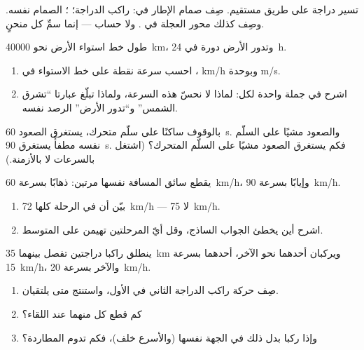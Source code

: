\begin{exercise}[$\star\star$]\label{exo:g10:relative-motion:9}
تسير دراجة على طريق مستقيم. صِف 
صمام الإطار في:  راكب الدراجة؛ ؛ 
الصمام نفسه. وصِف كذلك  محور العجلة في
. ولا حساب --- إنما سمِّ كل منحنٍ.
\end{exercise}

\begin{exercise}[$\star\star$]\label{exo:g10:relative-motion:10}
طول خط استواء الأرض نحو \qty{40000}{km}، وتدور الأرض
دورة في \qty{24}{h}.
\begin{enumerate}
  \item احسب سرعة نقطة على خط الاستواء في ،  \unit{km/h} وبوحدة \unit{m/s}.
  \item اشرح في جملة واحدة لكل: لماذا لا نحسّ هذه السرعة،
        ولماذا تبلّغ عبارتا ``تشرق الشمس'' و``تدور الأرض'' الرصد
        نفسه.
\end{enumerate}
\end{exercise}

\begin{exercise}[$\star\star$]\label{exo:g10:relative-motion:11}
بالوقوف ساكنًا على سلّم متحرك، يستغرق الصعود \qty{60}{s}.
والصعود مشيًا على السلّم نفسه مطفأً يستغرق \qty{90}{s}. فكم
يستغرق الصعود مشيًا على السلّم المتحرك؟ (اشتغل بالسرعات لا
بالأزمنة.)
\end{exercise}

\begin{exercise}[$\star\star\star$]\label{exo:g10:relative-motion:12}
يقطع سائق المسافة نفسها مرتين: ذهابًا بسرعة \qty{60}{km/h}،
وإيابًا بسرعة \qty{90}{km/h}.
\begin{enumerate}
  \item بيّن أن  في الرحلة كلها
        \qty{72}{km/h} --- لا \qty{75}{km/h}.
  \item اشرح أين يخطئ الجواب الساذج، وقل أيّ المرحلتين
        تهيمن على المتوسط.
\end{enumerate}
\end{exercise}

\begin{exercise}[$\star\star\star$]\label{exo:g10:relative-motion:13}
ينطلق راكبا دراجتين تفصل بينهما \qty{35}{km} ويركبان أحدهما نحو الآخر، أحدهما بسرعة
\qty{15}{km/h}، والآخر بسرعة \qty{20}{km/h}.
\begin{enumerate}
  \item صِف حركة راكب الدراجة الثاني في 
        الأول، واستنتج متى يلتقيان.
  \item كم قطع كل منهما عند اللقاء؟
  \item وإذا ركبا بدل ذلك في الجهة نفسها (والأسرع
        خلف)، فكم تدوم المطاردة؟
\end{enumerate}
\end{exercise}

